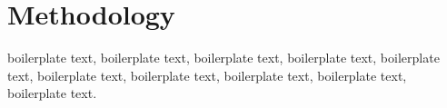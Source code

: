 \chapter{Methodology}


boilerplate text, boilerplate text, boilerplate text, boilerplate text, boilerplate text, boilerplate text, boilerplate text, boilerplate text, boilerplate text, boilerplate text.
